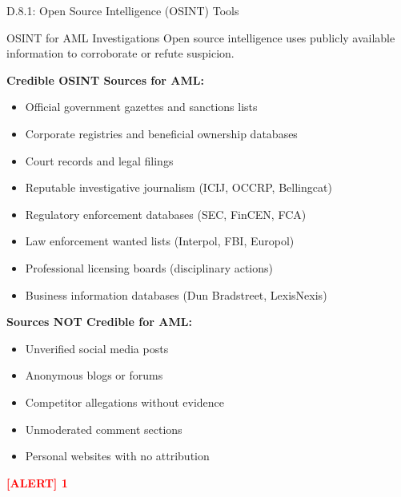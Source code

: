 \documentclass[11pt,a4paper]{beamer}
\newcommand{\redflag}[1]{\textcolor{red}{\textbf{[ALERT] 1}}}
\begin{document}
\begin{frame}{D.8.1: Open Source Intelligence (OSINT) Tools}
	\begin{block}{OSINT for AML Investigations}
		Open source intelligence uses publicly available information to corroborate or refute suspicion.
	\end{block}
	\textbf{Credible OSINT Sources for AML:}
	\begin{itemize}
		\item Official government gazettes and sanctions lists
		\item Corporate registries and beneficial ownership databases
		\item Court records and legal filings
		\item Reputable investigative journalism (ICIJ, OCCRP, Bellingcat)
		\item Regulatory enforcement databases (SEC, FinCEN, FCA)
		\item Law enforcement wanted lists (Interpol, FBI, Europol)
		\item Professional licensing boards (disciplinary actions)
		\item Business information databases (Dun   Bradstreet, LexisNexis)
	\end{itemize}
	\textbf{Sources NOT Credible for AML:}
	\begin{itemize}
		\item Unverified social media posts
		\item Anonymous blogs or forums
		\item Competitor allegations without evidence
		\item Unmoderated comment sections
		\item Personal websites with no attribution
	\end{itemize}
	\redflag{Investigators must distinguish between credible and non-credible sources.}
\end{frame}

\end{document}
